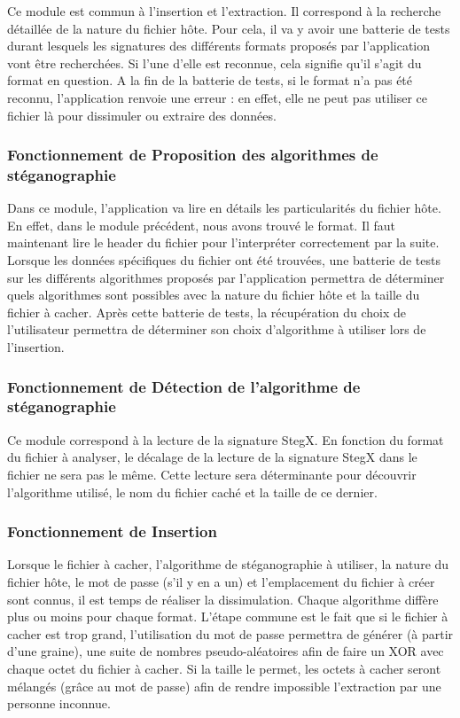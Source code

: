 \documentclass[11pt]{article}
\begin{document}
Ce module est commun à l'insertion et l'extraction. Il correspond à la 
recherche détaillée de la nature du fichier hôte. 
Pour cela, il va y avoir une batterie de tests durant lesquels les
signatures des différents formats proposés par l'application vont être recherchées. 
Si l'une d'elle est reconnue, cela signifie qu'il s'agit du format en question. 
A la fin de la batterie de tests, si le format n'a pas été reconnu, 
l'application renvoie une erreur : en effet, elle ne peut pas utiliser ce 
fichier là pour dissimuler ou extraire des données. 

\subsubsection{Fonctionnement de Proposition des algorithmes de stéganographie}

Dans ce module, l'application va lire en détails les particularités du fichier 
hôte. En effet, dans le module précédent, nous avons trouvé le format. Il 
faut maintenant lire le header du fichier pour l'interpréter correctement 
par la suite. Lorsque les données spécifiques du fichier ont été trouvées, 
une batterie de tests sur les différents algorithmes proposés par l'application
permettra de déterminer quels algorithmes sont possibles avec la nature 
du fichier hôte et la taille du fichier à cacher. 
Après cette batterie de tests, la récupération du choix de l'utilisateur 
permettra de déterminer son choix d'algorithme à utiliser lors de l'insertion. 

\subsubsection{Fonctionnement de Détection de l'algorithme de stéganographie}

Ce module correspond à la lecture de la signature StegX. En fonction du 
format du fichier à analyser, le décalage de la lecture de la signature StegX
dans le fichier ne sera pas le même. Cette lecture sera déterminante pour 
découvrir l'algorithme utilisé, le nom du fichier caché et la taille de 
ce dernier. 

\subsubsection{Fonctionnement de Insertion}

Lorsque le fichier à cacher, l'algorithme de stéganographie à utiliser, 
la nature du fichier hôte, le mot de passe (s'il y en a un) et l'emplacement 
du fichier à créer sont connus, il est temps de réaliser la dissimulation. 
Chaque algorithme diffère plus ou moins pour chaque format. 
L'étape commune est le fait que si le fichier à cacher est trop grand, 
l'utilisation du mot de passe permettra de générer (à partir d'une graine), 
une suite de nombres pseudo-aléatoires afin de faire un XOR avec chaque 
octet du fichier à cacher. Si la taille le permet, les octets à cacher 
seront mélangés (grâce au mot de passe) afin de rendre impossible l'extraction 
par une personne inconnue. 
\end{document}
